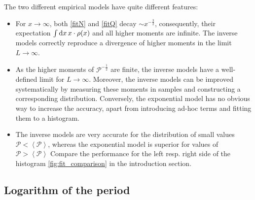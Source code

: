 \documentclass[12pt,a4paper]{article}
\renewcommand{\d}{\textnormal{d}}
\newcommand{\period}{\mathcal P}
\renewcommand{\|}{\rule[-0.4ex]{0.2ex}{1.2em}}
\begin{document}
The two different empirical models have quite different features:
\begin{itemize}
	\item For $x\rightarrow\infty$, both   \cref{fitN} and \cref{fitQ} decay   $\sim x^{-\frac 3 2}$, consequently, their expectation $\int \d x \, x\cdot \rho(x)$ and all higher moments are infinite. The inverse models correctly reproduce a divergence of higher moments in the limit $L \rightarrow \infty$.
	\item As the higher moments of $\period^{-\frac 12}$ are  finite, the inverse models have a well-defined limit  for $L \rightarrow \infty$. Moreover, the inverse models can be improved systematically by measuring these moments in samples and constructing a corresponding distribution. Conversely, the exponential model has no obvious way to increase the accuracy, apart from introducing ad-hoc terms and fitting them to a histogram.
	\item The inverse models are very accurate for the distribution of small values $\period<\left \langle \period \right \rangle  $, whereas the exponential model is superior for values of $\period>\left \langle \period \right \rangle  $ Compare the performance for the left resp. right side of the histogram \cref{fig:fit_comparison} in the introduction section. 
\end{itemize}













\FloatBarrier




\subsection{Logarithm of the period}\label{sec:logarithm}
\end{document}
